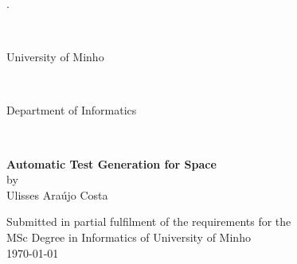 \thispagestyle{empty}
\begin{center}
\begin{tiny}.\end{tiny}\\
\vspace{3.5cm}
\begin{huge} University of Minho \end{huge} \\
\vspace{0.3cm}
\begin{LARGE} Department of Informatics \end{LARGE} \\
\vspace{5cm}

\begin{large}
\textbf{Automatic Test Generation for Space}\\
\vspace{0.2cm}
by\\ 
\vspace{0.2cm}
Ulisses Araújo Costa\\
\end{large}

\vspace{8cm}
Submitted in partial fulfilment of the requirements for the \\
MSc Degree in Informatics of University of Minho\\
\vspace{2cm}
\today\\
\end{center} 
